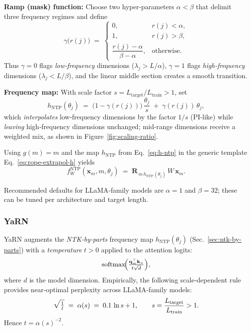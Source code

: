 \noindent\textbf{Ramp (mask) function:}
Choose two hyper‑parameters $\alpha<\beta$ that delimit three
frequency regimes and define
\begin{equation}
  \gamma\!\bigl(r(j)\bigr)
  \;=\;
  \begin{cases}
    0, & r(j)<\alpha,\\[6pt]
    1, & r(j)>\beta,\\[6pt]
    \dfrac{r(j)-\alpha}{\beta-\alpha}, & \text{otherwise}.
  \end{cases}
  \label{eq:ramp}
\end{equation}
Thus $\gamma=0$ flags \emph{low‑frequency} dimensions
($\lambda_j\!>\!L/\alpha$), $\gamma=1$ flags
\emph{high‑frequency} dimensions
($\lambda_j\!<\!L/\beta$), and the linear middle section creates a
smooth transition.

\noindent\textbf{Frequency map:}
With scale factor $s\!=\!L_{\text{target}}/L_{\text{train}}>1$, set
\begin{equation}
  h_{\text{NTP}}(\theta_j)
  \;=\;
  \bigl(1-\gamma(r(j))\bigr)\,\frac{\theta_j}{s}
  \;+\;
  \gamma(r(j))\,\theta_j,
  \label{eq:h-ntp}
\end{equation}
which \emph{interpolates} low‑frequency dimensions by the factor
$1/s$ (PI‑like) while \emph{leaving} high‑frequency dimensions
unchanged; mid‑range dimensions receive a weighted mix, as shown in Figure~\ref{fig:scaling-ratio}. 

\begin{definition}\label{def:ntk-by-parts}
Using $g(m)=m$ and the map $h_{\text{NTP}}$ from
Eq.~\eqref{eq:h-ntp} in the generic template
Eq.~\eqref{eq:rope-extrapol-h} yields
\begin{equation}
  f_W^{\text{NTP}}(\mathbf x_m,m,\theta_j)
  \;=\;
  \mathbf R_{\,m\,h_{\text{NTP}}(\theta_j)}\,W\,\mathbf x_m .
  \label{eq:ntp-final}
\end{equation}
\end{definition}

Recommended defaults for LLaMA‑family models are
$\alpha=1$ and $\beta=32$; these can be tuned per architecture
and target length.

\subsubsection{YaRN}
\label{sec:yarn}

YaRN augments the \textit{NTK‑by‑parts} frequency map
$h_{\text{NTP}}(\theta_j)$ (Sec.~\ref{sec:ntk-by-parts}) with a
\emph{temperature} $t>0$ applied to the attention logits:
\begin{equation}
  \operatorname{softmax}\!\Bigl(
     \tfrac{\mathbf q_m^{\top}\mathbf k_n}{\,t\sqrt{d}\,}
  \Bigr),
  \label{eq:yarn-softmax}
\end{equation}
where $d$ is the model dimension.
Empirically, the following scale‑dependent rule provides near‑optimal
perplexity across LLaMA‑family models:
\begin{equation}
  \sqrt{\smash[b]{\tfrac1t}}
  \;=\;
  \alpha(s)
  \;=\;
  0.1\,\ln s + 1,
  \qquad
  s=\frac{L_{\text{target}}}{L_{\text{train}}}>1 .
  \label{eq:yarn-alpha}
\end{equation}
Hence $t=\alpha(s)^{-2}$.

